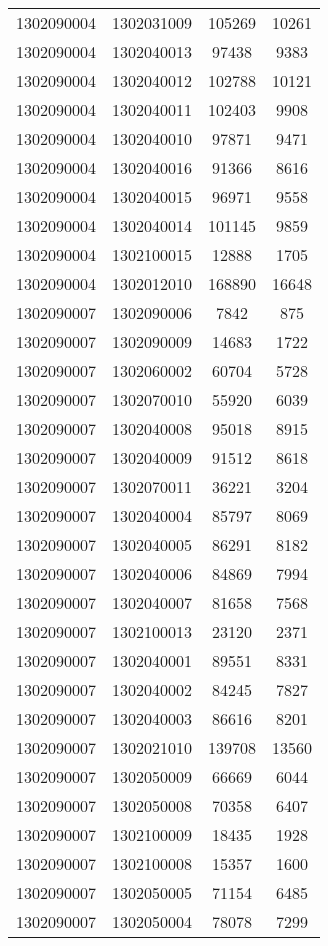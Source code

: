 \begin{longtable}[h]{llcc}
		1302090004 & 1302031009 & 105269 & 10261\\
		1302090004 & 1302040013 & 97438 & 9383\\
		1302090004 & 1302040012 & 102788 & 10121\\
		1302090004 & 1302040011 & 102403 & 9908\\
		1302090004 & 1302040010 & 97871 & 9471\\
		1302090004 & 1302040016 & 91366 & 8616\\
		1302090004 & 1302040015 & 96971 & 9558\\
		1302090004 & 1302040014 & 101145 & 9859\\
		1302090004 & 1302100015 & 12888 & 1705\\
		1302090004 & 1302012010 & 168890 & 16648\\
		1302090007 & 1302090006 & 7842 & 875\\
		1302090007 & 1302090009 & 14683 & 1722\\
		1302090007 & 1302060002 & 60704 & 5728\\
		1302090007 & 1302070010 & 55920 & 6039\\
		1302090007 & 1302040008 & 95018 & 8915\\
		1302090007 & 1302040009 & 91512 & 8618\\
		1302090007 & 1302070011 & 36221 & 3204\\
		1302090007 & 1302040004 & 85797 & 8069\\
		1302090007 & 1302040005 & 86291 & 8182\\
		1302090007 & 1302040006 & 84869 & 7994\\
		1302090007 & 1302040007 & 81658 & 7568\\
		1302090007 & 1302100013 & 23120 & 2371\\
		1302090007 & 1302040001 & 89551 & 8331\\
		1302090007 & 1302040002 & 84245 & 7827\\
		1302090007 & 1302040003 & 86616 & 8201\\
		1302090007 & 1302021010 & 139708 & 13560\\
		1302090007 & 1302050009 & 66669 & 6044\\
		1302090007 & 1302050008 & 70358 & 6407\\
		1302090007 & 1302100009 & 18435 & 1928\\
		1302090007 & 1302100008 & 15357 & 1600\\
		1302090007 & 1302050005 & 71154 & 6485\\
		1302090007 & 1302050004 & 78078 & 7299\\

\end{longtable}
